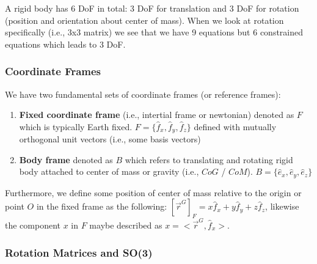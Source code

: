 \documentclass{article}
\begin{document}
A rigid body has 6 DoF in total: 3 DoF for translation and 3 DoF for rotation (position and orientation about center of mass). When we look at rotation specifically (i.e., 3x3 matrix) we see that we have 9 equations but 6 constrained equations which leads to 3 DoF.

\subsubsection{Coordinate Frames}

We have two fundamental sets of coordinate frames (or reference frames):
\begin{enumerate}
    \item \textbf{Fixed coordinate frame} (i.e., intertial frame or newtonian) denoted as $F$ which is typically Earth fixed. $F = \{\hat{f}_x, \hat{f}_y, \hat{f}_z\}$ defined with mutually orthogonal unit vectors (i.e., some basis vectors)
    \item \textbf{Body frame} denoted as $B$ which refers to translating and rotating rigid body attached to center of mass or gravity (i.e., $CoG$ / $CoM$). $B = \{\hat{e}_x, \hat{e}_y, \hat{e}_z\}$
\end{enumerate}
Furthermore, we define some position of center of mass relative to the origin or point $O$ in the fixed frame as the following: $[\vec{r}^G]_F = x \hat{f}_x + y \hat{f}_y + z \hat{f}_z$, likewise the component $x$ in $F$ maybe described as $x = <\vec{r}^G,\hat{f}_x>$.

\subsubsection{Rotation Matrices and SO(3)}
\end{document}

